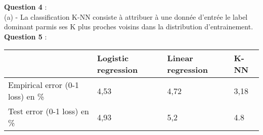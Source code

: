\documentclass[11pt,a4paper]{article}
\begin{document}
\textbf{Question 4} : \\ (a) - La classification K-NN consiste à attribuer à une donnée d'entrée le label dominant parmis ses K plus proches voisins dans la distribution d'entrainement. \\

\textbf{Question 5} : \\

\begin{tabular}{|C{5.5cm}|C{3.5cm}|C{3cm}|C{3cm}|}
  \hline
  & Logistic regression & Linear regression & K-NN \\
  \hline
  Empirical error (0-1 loss) en \% & 4,53 & 4,72 & 3,18 \\
  \hline
  Test error (0-1 loss) en \% & 4,93 & 5,2 & 4.8 \\
  \hline
  
\end{tabular}
\end{document}
